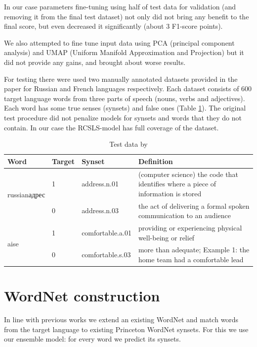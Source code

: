 \documentclass[11pt,a4paper]{article}
\begin{document}
In our case parameters fine-tuning using half of test data for validation (and removing it from the final test dataset) not only did not bring any benefit to the final score, but even decreased it significantly (about 3 F1-score points).

We also attempted to fine tune input data using PCA (principal component analysis) and UMAP (Uniform Manifold Approximation and Projection) \cite{umap} but it did not provide any gains, and brought about worse results.

For testing there were used two manually annotated datasets provided in the paper \cite{Khodak2017} for Russian and French languages respectively. Each dataset consists of 600 target language words from three parts of speech (nouns, verbs and adjectives). Each word has some true senses (synsets) and false ones (Table \ref{wordnet-test-data}). The original test procedure did not penalize models for synsets and words that they do not contain. In our case the RCSLS-model has full coverage of the dataset.

\begin{table}[!htbp]
	\small
	\caption{Test data by \cite{Khodak2017}}
	\label{wordnet-test-data}		
	\centering
	\begin{tabular}{l l l l}
		\hline
		Word & Target &  Synset & Definition \\ \hline
		\multirow{2}{*}{\begin{otherlanguage*}{russian}адрес \end{otherlanguage*}}
		& \multicolumn{1}{l}{1} & \multicolumn{1}{l}{address.n.01} & \multicolumn{1}{l}{(computer science) the code that identifies where a piece of information is stored} \\
		& \multicolumn{1}{l}{0} & \multicolumn{1}{l}{address.n.03} & \multicolumn{1}{l}{the act of delivering a formal spoken communication to an audience} \\
		\hline
		\multirow{2}{*}{aise}
		& \multicolumn{1}{l}{1} & \multicolumn{1}{l}{comfortable.a.01} & \multicolumn{1}{l}{providing or experiencing physical well-being or relief} \\
		& \multicolumn{1}{l}{0} & \multicolumn{1}{l}{comfortable.s.03} & \multicolumn{1}{l}{more than adequate; Example 1: the home team had a comfortable lead} \\
		\hline
	\end{tabular}
	
\end{table}


\section{WordNet construction}
In line with previous works \cite{Vossen1998,tufis2006romanian} we extend an existing WordNet and match words from the target language to existing Princeton WordNet synsets. For this we use our ensemble model: for every word we predict its synsets.
\end{document}
